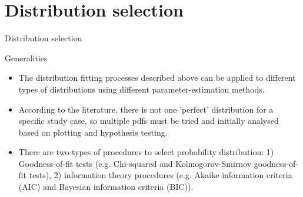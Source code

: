 \documentclass[8pt]{beamer}
\renewcommand{\emph}[1]{\textcolor{myorange}{#1}}
\begin{document}
\section{Distribution selection}
\begin{frame}{Distribution selection}
    \begin{block}{Generalities}
    \end{block}
    \begin{itemize}
        \item The distribution fitting processes described above can be applied to different types of distributions using different parameter-estimation methods. 
        \item According to the literature, there is not one 'perfect' distribution for a specific study case, so  multiple \emph{pdfs} must be tried and initially analysed based on \emph{plotting} and \emph{hypothesis testing}. 
        \item There are two types of procedures to select  \emph{probability distribution:} 1) \emph{Goodness-of-fit tests} (e.g. Chi-squared and Kolmogorov-Smirnov goodness-of-fit tests), 2) \emph{information theory procedures} (e.g. Akaike information criteria (AIC) and Bayesian information criteria (BIC)). 
    \end{itemize}
\end{frame}
\end{document}
